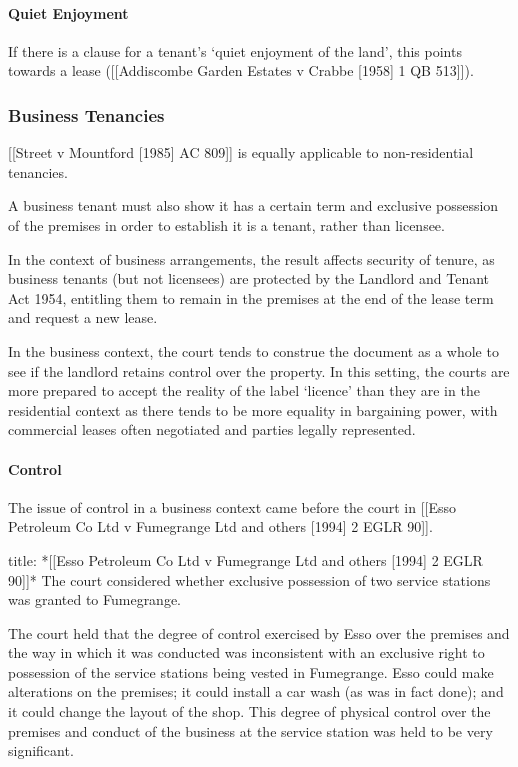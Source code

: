 \documentclass[
]{article}
\newenvironment{Shaded}{}{}
\newcommand{\NormalTok}[1]{#1}
\begin{document}
\hypertarget{quiet-enjoyment}{%
\paragraph{Quiet Enjoyment}\label{quiet-enjoyment}}

If there is a clause for a tenant's `quiet enjoyment of the land', this
points towards a lease ({[}{[}Addiscombe Garden Estates v Crabbe
{[}1958{]} 1 QB 513{]}{]}).

\hypertarget{business-tenancies}{%
\subsubsection{Business Tenancies}\label{business-tenancies}}

{[}{[}Street v Mountford {[}1985{]} AC 809{]}{]} is equally applicable
to non-residential tenancies.

A business tenant must also show it has a certain term and exclusive
possession of the premises in order to establish it is a tenant, rather
than licensee.

In the context of business arrangements, the result affects security of
tenure, as business tenants (but not licensees) are protected by the
Landlord and Tenant Act 1954, entitling them to remain in the premises
at the end of the lease term and request a new lease.

In the business context, the court tends to construe the document as a
whole to see if the landlord retains control over the property. In this
setting, the courts are more prepared to accept the reality of the label
`licence' than they are in the residential context as there tends to be
more equality in bargaining power, with commercial leases often
negotiated and parties legally represented.

\hypertarget{control}{%
\paragraph{Control}\label{control}}

The issue of control in a business context came before the court in
{[}{[}Esso Petroleum Co Ltd v Fumegrange Ltd and others {[}1994{]} 2
EGLR 90{]}{]}.

\begin{Shaded}
\begin{Highlighting}[]
\NormalTok{title: *[[Esso Petroleum Co Ltd v Fumegrange Ltd and others [1994] 2 EGLR 90]]*}
\NormalTok{The court considered whether exclusive possession of two service stations was granted to Fumegrange.}

\NormalTok{The court held that the degree of control exercised by Esso over the premises and the way in which it was conducted was inconsistent with an exclusive right to possession of the service stations being vested in Fumegrange. Esso could make alterations on the premises; it could install a car wash (as was in fact done); and it could change the layout of the shop. This degree of physical control over the premises and conduct of the business at the service station was held to be very significant.}
\end{Highlighting}
\end{Shaded}
\end{document}
